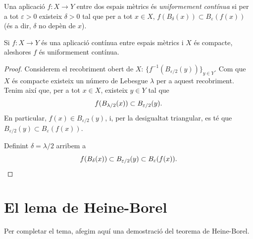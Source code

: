 \documentclass[../main.tex]{subfiles}
\begin{document}
\begin{defi}
\label{def:appuniformementcontinua} Una aplicació $f:X\rightarrow Y$ entre dos espais mètrics és \textit{uniformement contínua} si per a tot $\varepsilon>0$ existeix $\delta>0$ tal que per a tot $x\in X$, $f(B_\delta(x))\subset B_\varepsilon(f(x))$ (és a dir, $\delta$ no depèn  de $x$).
\end{defi}

\begin{prop}
\label{prop:uniformementcontinua} Si $f:X\rightarrow Y$ és una aplicació contínua entre espais mètrics i $X$ és compacte, aleshores $f$ és uniformement contínua.
\end{prop}
\begin{proof}
Considerem el recobriment obert de $X$: $\{f^{-1}(B_{\varepsilon/2}(y))\}_{y\in Y}$. Com que $X$ és compacte existeix un número de Lebesgue $\lambda$ per a aquest recobriment. Tenim així que, per a tot $x\in X$, existeix $y\in Y$ tal que 
\begin{equation}
    \notag
    f(B_{\lambda/2}(x))\subset B_{\varepsilon/2}(y).
\end{equation}
En particular, $f(x)\in B_{\varepsilon/2}(y)$, i, per la desigualtat triangular, es té que $B_{\varepsilon/2}(y)\subset B_\varepsilon(f(x))$.

Definint $\delta = \lambda/2$ arribem a 
\begin{equation}
    \notag
    f(B_\delta(x))\subset B_{\varepsilon/2}(y)\subset B_\varepsilon(f(x)).
\end{equation}
\end{proof}

\section{El lema de Heine-Borel}

Per completar el tema, afegim aquí una demostració del teorema de Heine-Borel.
\end{document}
